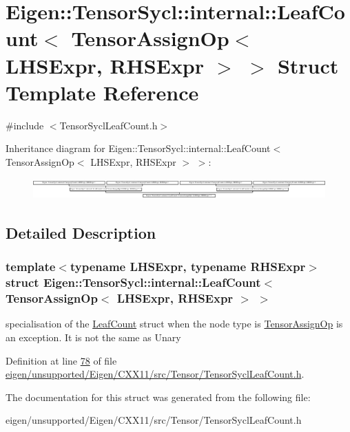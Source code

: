 \hypertarget{struct_eigen_1_1_tensor_sycl_1_1internal_1_1_leaf_count_3_01_tensor_assign_op_3_01_l_h_s_expr_00_01_r_h_s_expr_01_4_01_4}{}\section{Eigen\+:\+:Tensor\+Sycl\+:\+:internal\+:\+:Leaf\+Count$<$ Tensor\+Assign\+Op$<$ L\+H\+S\+Expr, R\+H\+S\+Expr $>$ $>$ Struct Template Reference}
\label{struct_eigen_1_1_tensor_sycl_1_1internal_1_1_leaf_count_3_01_tensor_assign_op_3_01_l_h_s_expr_00_01_r_h_s_expr_01_4_01_4}


{\ttfamily \#include $<$Tensor\+Sycl\+Leaf\+Count.\+h$>$}

Inheritance diagram for Eigen\+:\+:Tensor\+Sycl\+:\+:internal\+:\+:Leaf\+Count$<$ Tensor\+Assign\+Op$<$ L\+H\+S\+Expr, R\+H\+S\+Expr $>$ $>$\+:\begin{figure}[H]
\begin{center}
\leavevmode
\includegraphics[height=0.806142cm]{struct_eigen_1_1_tensor_sycl_1_1internal_1_1_leaf_count_3_01_tensor_assign_op_3_01_l_h_s_expr_00_01_r_h_s_expr_01_4_01_4}
\end{center}
\end{figure}


\subsection{Detailed Description}
\subsubsection*{template$<$typename L\+H\+S\+Expr, typename R\+H\+S\+Expr$>$\newline
struct Eigen\+::\+Tensor\+Sycl\+::internal\+::\+Leaf\+Count$<$ Tensor\+Assign\+Op$<$ L\+H\+S\+Expr, R\+H\+S\+Expr $>$ $>$}

specialisation of the \hyperlink{struct_eigen_1_1_tensor_sycl_1_1internal_1_1_leaf_count}{Leaf\+Count} struct when the node type is \hyperlink{class_eigen_1_1_tensor_assign_op}{Tensor\+Assign\+Op} is an exception. It is not the same as Unary 

Definition at line \hyperlink{eigen_2unsupported_2_eigen_2_c_x_x11_2src_2_tensor_2_tensor_sycl_leaf_count_8h_source_l00078}{78} of file \hyperlink{eigen_2unsupported_2_eigen_2_c_x_x11_2src_2_tensor_2_tensor_sycl_leaf_count_8h_source}{eigen/unsupported/\+Eigen/\+C\+X\+X11/src/\+Tensor/\+Tensor\+Sycl\+Leaf\+Count.\+h}.



The documentation for this struct was generated from the following file\+:\begin{DoxyCompactItemize}
\item 
eigen/unsupported/\+Eigen/\+C\+X\+X11/src/\+Tensor/\+Tensor\+Sycl\+Leaf\+Count.\+h\end{DoxyCompactItemize}
